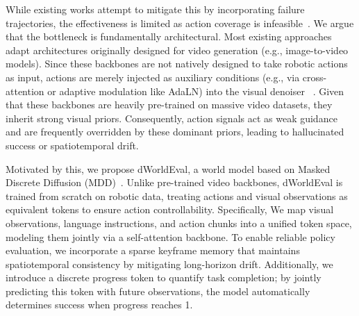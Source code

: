 



While existing works attempt to mitigate this by incorporating failure trajectories, the effectiveness is limited as action coverage is infeasible~\cite{guo2025ctrl,ho20251x}. We argue that the bottleneck is fundamentally architectural. 
Most existing approaches adapt architectures originally designed for video generation (e.g., image-to-video models).
Since these backbones are not natively designed to take robotic actions as input, actions are merely injected as auxiliary conditions (e.g., via cross-attention or adaptive modulation like AdaLN) into the visual denoiser
~\cite{li2025worldeval,guo2025ctrl,quevedo2506worldgym}.
Given that these backbones are heavily pre-trained on massive video datasets, they inherit strong visual priors.
Consequently, action signals act as weak guidance and are frequently overridden by these dominant priors, leading to hallucinated success or spatiotemporal drift.

Motivated by this, we propose dWorldEval, a world model based on Masked Discrete Diffusion (MDD)~\cite{austin2021structured,sahoo2024simple,lou2023discrete,LLaDA,lavida,MMaDA}. 
Unlike pre-trained video backbones, dWorldEval is trained from scratch on robotic data, treating actions and visual observations as equivalent tokens to ensure action controllability.
Specifically, We map visual observations, language instructions, and action chunks into a unified token space, modeling them jointly via a self-attention backbone.
To enable reliable policy evaluation, we incorporate a sparse keyframe memory that maintains spatiotemporal consistency by mitigating long-horizon drift. Additionally, we introduce a discrete progress token to quantify task completion; by jointly predicting this token with future observations, the model automatically determines success when progress reaches 1.

